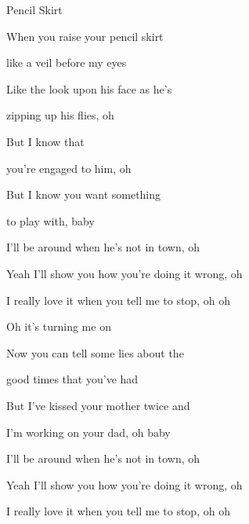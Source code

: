 \begin{song}{Pencil Skirt}{
	
	\chordset[Verse]{ \CMaj \AMaj \DMaj \GMaj }
	\chordset[Chorus]{ \EmShAm \CMajShE \DMajShA \GMajShE}
}

\begin{songverse}

 When you raise your pencil skirt 


 like a veil before my eyes

 
 Like the look upon his face as he's

 
 zipping up his flies, oh


 But I know that


 you're engaged to him, oh


\hspace{10pt}But I  know you want something 


to play with, baby

\end{songverse}

\begin{songverse}

 I'll be around when he's not in town, oh


 Yeah I'll show you how you're doing it wrong, oh 


 I really love it when you tell me to stop, oh oh 
                
 
 Oh it's turning me on

\end{songverse}

\begin{songverse}

 Now you can tell some lies about the


good times that you've had


But I've kissed your mother twice and


I'm working on your dad, oh baby


\end{songverse}

\begin{songverse}

 I'll be around when he's not in town, oh 


 Yeah I'll show you how you're doing it wrong, oh 


 I really love it when you tell me to stop, oh oh 
                

\end{songverse}
\end{song}
